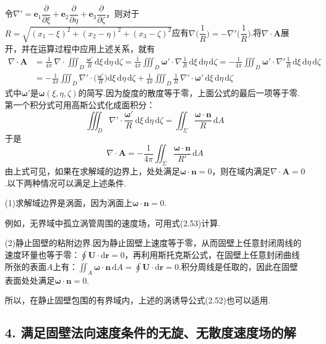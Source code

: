 令$\nabla'=\boldsymbol{e}_1\dfrac{\partial}{\partial\xi}+\boldsymbol{e}_2\dfrac{\partial}{\partial\eta}+\boldsymbol{e}_3\dfrac{\partial}{\partial\zeta}$，则对于$R=\sqrt{(x_1-\xi)^{2}+(x_2-\eta)^{2}+(x_3-\zeta)^{2}}$应有$\nabla\Big(\dfrac{1}{R}\Big)=-\nabla'\Big(\dfrac{1}{R}\Big)$.将$\nabla\cdot\boldsymbol{A}$展开，并在运算过程中应用上述关系，就有
\begin{align*}
\nabla\cdot\boldsymbol{A}&=\frac{1}{4\pi}\,\nabla\cdot\iiint_D \frac{\boldsymbol{\omega}'}{R}\,\mathrm{d}\xi\,\mathrm{d}\eta\,\mathrm{d}\zeta=\frac{1}{4\pi}\iiint_D \boldsymbol{\omega}'\cdot\nabla\frac{1}{R}\,\mathrm{d}\xi\,\mathrm{d}\eta\,\mathrm{d}\zeta=-\frac{1}{4\pi}\iiint_D \boldsymbol{\omega}'\cdot\nabla'\frac{1}{R}\,\mathrm{d}\xi\,\mathrm{d}\eta\,\mathrm{d}\zeta\\
&=-\frac{1}{4\pi}\iiint_D \nabla'\cdot\Big(\frac{\boldsymbol{\omega}'}{R}\Big)\mathrm{d}\xi\,\mathrm{d}\eta\,\mathrm{d}\zeta+\frac{1}{4\pi}\iiint_D \frac{1}{R}\,\nabla'\cdot\boldsymbol{\omega}'\,\mathrm{d}\xi\,\mathrm{d}\eta\,\mathrm{d}\zeta
\end{align*}
式中$\boldsymbol{\omega}'$是$\boldsymbol{\omega}(\xi,\eta,\zeta)$的简写.因为旋度的散度等于零，上面公式的最后一项等于零.第一个积分式可用高斯公式化成面积分：
\[
\iiint_D \nabla'\cdot\frac{\boldsymbol{\omega}'}{R}\,\mathrm{d}\xi\,\mathrm{d}\eta\,\mathrm{d}\zeta=\iint_\Sigma \frac{\boldsymbol{\omega}\cdot\boldsymbol{n}}{R}\,\mathrm{d}A
\]
于是
\[
\nabla\cdot\boldsymbol{A}=-\frac{1}{4\pi}\iint_\Sigma \frac{\boldsymbol{\omega}\cdot\boldsymbol{n}}{R'}\,\mathrm{d}A
\]
由上式可见，如果在求解域的边界上，处处满足$\boldsymbol{\omega}\cdot\boldsymbol{n}=0$，则在域内满足$\nabla\cdot\boldsymbol{A}=0$.以下两种情况可以满足上述条件.

(1)求解域边界是涡面，因为涡面上$\boldsymbol{\omega}\cdot\boldsymbol{n}=0$.

例如，无界域中孤立涡管周围的速度场，可用式(2.53)计算.

(2)静止固壁的粘附边界.因为静止固壁上速度等于零，从而固壁上任意封闭周线的速度环量也等于零：$\displaystyle\oint\boldsymbol{U}\cdot\mathrm{d}\boldsymbol{r}=0$，再利用斯托克斯公式，在固壁上任意封闭曲线所张的表面$A$上有：$\displaystyle\iint_A \boldsymbol{\omega}\cdot\boldsymbol{n}\,\mathrm{d}A=\oint\boldsymbol{U}\cdot\mathrm{d}\boldsymbol{r}=0$.积分周线是任取的，因此在固壁表面处处满足$\boldsymbol{\omega}\cdot\boldsymbol{n}=0$.

所以，在静止固壁包围的有界域内，上述的涡诱导公式(2.52)也可以适用.

\subsection*{4. 满足固壁法向速度条件的无旋、无散度速度场的解}

